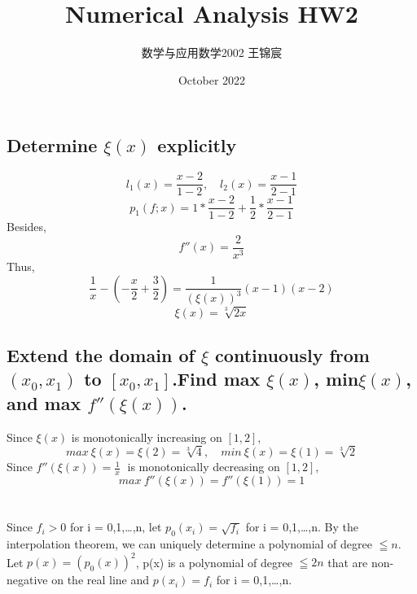 \documentclass[UTF8]{ctexart}
\title{Numerical Analysis HW2}
\author{数学与应用数学2002 王锦宸 }
\date{October 2022}
\begin{document}
\maketitle

\section{}
\subsection{Determine $\xi (x)$ explicitly}
$$l_1(x) = \frac{x-2}{1-2},\quad l_2(x) = \frac{x-1}{2-1}$$
$$p_1(f;x) = 1* \frac {x-2}{1-2} + \frac{1}{2}*\frac{x-1}{2-1}$$
Besides,\\
$$f''(x) = \frac{2}{x^3}$$
Thus,\\
$$\frac{1}{x} - (-\frac{x}{2} + \frac{3}{2})= \frac{1}{(\xi (x))^3} (x-1)(x-2)$$
$$\xi(x) = \sqrt[3]{2x}$$
\subsection{Extend the domain of $\xi$ continuously from $(x_0,x_1)$ to $[x_0,x_1]$.Find max $\xi(x)$,\; min$\xi (x)$, and max $f''(\xi (x))$.}
\noindent Since $\xi (x)$ is monotonically increasing on $[1,2]$,
$$max\:\xi (x) = \xi (2) = \sqrt[3]{4},\quad min\:\xi (x) = \xi (1) = \sqrt[3]{2}$$
Since $f''(\xi(x)) = \frac{1}{x}\;$ is monotonically decreasing on $[1,2]$, 
$$max\:f''(\xi(x)) = f''(\xi(1)) = 1$$

\section{}
Since $f_i > 0$ for i = 0,1,\dots,n, let $p_0(x_i) = \sqrt{f_i}$ for i = 0,1,\dots,n. By the interpolation theorem, we can uniquely determine a polynomial of degree $\leqq n$. Let $ p(x) = (p_0(x))^2$, p(x) is a polynomial of degree $\leqq 2n$ that are non-negative on the real line and $p(x_i) = f_i$ for i = 0,1,\dots,n.

\section{}
\end{document}
